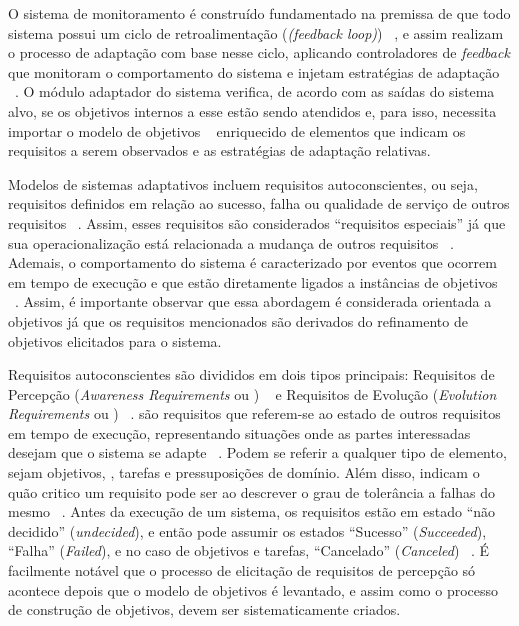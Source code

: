 O sistema de monitoramento é construído fundamentado na premissa de que todo sistema possui um ciclo de retroalimentação (\textit{(feedback loop)}) ~\cite{brun2009engineering}, e assim realizam o processo de adaptação com base nesse ciclo, aplicando controladores de \textit{feedback} que monitoram o comportamento do sistema e injetam estratégias de adaptação ~\cite{souza2013awareness}. O módulo adaptador do sistema verifica, de acordo com as saídas do sistema alvo, se os objetivos internos a esse estão sendo atendidos e, para isso, necessita importar o modelo de objetivos ~\cite{souza2013awareness} enriquecido de elementos que indicam os requisitos a serem observados e as estratégias de adaptação relativas.

Modelos de sistemas adaptativos incluem requisitos autoconscientes, ou seja, requisitos definidos em relação ao sucesso, falha ou qualidade de serviço de outros requisitos ~\cite{souza2013awareness}. Assim, esses requisitos são considerados ``requisitos especiais'' já que sua operacionalização está relacionada a mudança de outros requisitos ~\cite{souza2012requirement}. Ademais, o comportamento do sistema é caracterizado por eventos que ocorrem em tempo de execução e que estão diretamente ligados a instâncias de objetivos ~\cite{dalpiaz2013runtime}. Assim, é importante observar que essa abordagem é considerada orientada a objetivos já que os requisitos mencionados são derivados do refinamento de objetivos elicitados para o sistema.

Requisitos autoconscientes são divididos em dois tipos principais: Requisitos de Percepção (\textit{Awareness Requirements} ou \awreqs) ~\cite{souza2013awareness} e Requisitos de Evolução (\textit{Evolution Requirements} ou \evoreqs) ~\cite{souza2012requirement}. \awreqs são requisitos que referem-se ao estado de outros requisitos em tempo de execução, representando situações onde as partes interessadas desejam que o sistema se adapte ~\cite{souza2012requirement}. Podem se referir a qualquer tipo de elemento, sejam objetivos, \sofgoals, tarefas e pressuposições de domínio. Além disso, indicam o quão critico um requisito pode ser ao descrever o grau de tolerância a falhas do mesmo ~\cite{souza2012requirement}. Antes da execução de um sistema, os requisitos estão em estado ``não decidido'' (\textit{undecided}), e então pode assumir os estados ``Sucesso'' (\textit{Succeeded}), ``Falha'' (\textit{Failed}), e no caso de objetivos e tarefas, ``Cancelado'' (\textit{Canceled}) ~\cite{souza2013awareness}. É facilmente notável que o processo de elicitação de requisitos de percepção só acontece depois que o modelo de objetivos é levantado, e assim como o processo de construção de objetivos, \awreqs devem ser sistematicamente criados.

